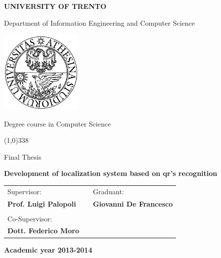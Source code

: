 \begin{titlepage}
  \pagestyle{empty}

  \begin{center}
    {\bfseries\Large {\huge U}NIVERSITY OF {\huge T}RENTO}

    \vspace{0.2cm}

    {\large Department of Information Engineering and Computer Science}

    \vspace{0.5cm}

    \begin{center}
      \includegraphics[width=0.3\textwidth]{img/logo_unitn.png}
    \end{center}

    \vspace{0.5cm}

    {\Large Degree course in Computer Science}

    \vspace{0.2cm}
    \line(1,0){338}
    \vspace{0.5cm}

    {\Large Final Thesis}

    \vspace{2.0cm}

    {\Large \bfseries {Development of localization system based on qr's recognition}}

    \vspace{0.3cm}
    

    \large
    \begin{center}
      \begin{tabular}{lcl}
        Supervisor: & \hspace{5cm} &  Graduant: \\
        {\bfseries Prof. Luigi Palopoli} & \hspace{5cm} & {\bfseries Giovanni De Francesco } \\ \\
        Co-Supervisor: \\ {\bfseries Dott. Federico Moro}
      \end{tabular}
    \end{center}
    \vspace{2.0cm}

    {\large \bfseries Academic year 2013-2014}
    \vfill

  \end{center}

\end{titlepage}
